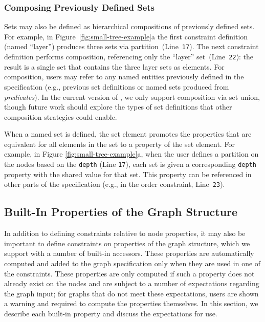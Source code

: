 \subsubsection{Composing Previously Defined Sets}
Sets may also be defined as hierarchical
compositions of previously defined sets. For example, in
Figure~\ref{fig:small-tree-example}a the first constraint definition
(named ``layer'') produces three sets via
partition~(Line~\texttt{17}). The next constraint definition performs 
composition, referencing only the ``layer'' set~(Line~\texttt{22}): the result
is a single set that contains the three layer sets as elements.
For composition, users may
refer to any named entities previously defined in the specification (e.g.,
previous set definitions or named sets produced from \emph{predicates}).
In the current version of \projectname, we only support composition via
set union, though future work should explore the types of set definitions
that other composition strategies could enable.

When a named set is defined, the set element promotes the properties that
are equivalent for all elements in the set to a property of the set
element. For example, in Figure \ref{fig:small-tree-example}a, when the user
defines a partition on the nodes based on the \texttt{depth} (Line
\texttt{17}), each set is given a corresponding \texttt{depth} property with
the shared value for that set. This property can be referenced in other 
parts of the \projectname specification (e.g., in the order constraint, Line~\texttt{23}).

\subsection{Built-In Properties of the Graph Structure}
\label{sec:built-in-properties}

In addition to defining constraints relative to node properties, it may
also be important to define constraints on properties
of the graph structure, which we support with a number of built-in accessors.
These properties are automatically computed and added to the graph 
specification only when they are used in one of the \projectname constraints. 
These properties are only computed if such a property does not
already exist on the nodes and are subject to a number of expectations
regarding the graph input; for graphs that do not meet these expectations,
users are shown a warning and required to compute the properties
themselves. In this section, we describe each built-in property and discuss 
the expectations for use.

